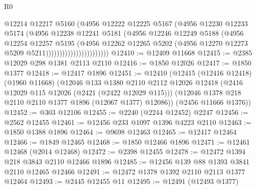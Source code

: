 \begin{lexlean}{R0}
\begin{coremodule}
                                    @12214
                                    @12217
                                    @5160
                                    (@4956
                                      @12222
                                      @12225
                                      @5167
                                      (@4956
                                        @12230
                                        @12233
                                        @5174
                                        (@4956
                                          @12238
                                          @12241
                                          @5181
                                          (@4956
                                            @12246
                                            @12249
                                            @5188
                                            (@4956
                                              @12254
                                              @12257
                                              @5195
                                              (@4956
                                                @12262
                                                @12265
                                                @5202
                                                (@4956
                                                  @12270
                                                  @12273
                                                  @5209
                                                  @5211)))))))))))))))))))))))
@12410 := @12409 @11668
@12415 := @2385 @12029 @298 @1381 @2113 @2110
@12416 := @1850 @12026
@12417 := @1850 @1377
@12418 := @12417 @1896
@12451 := @12410
    (@12415
      (@12416 @12418)
      (@1960 @11668)
      (@12046
        @133
        @1380
        @2110
        @2112
        @12026
        @12418
        (@2416 @12029 @115 @12026 (@2421 (@2422 @12029 @115)))
        (@12046 @1378 @218 @2110 @2110 @1377 @1896 (@12067 @1377) @12086))
      (@2456 @11666 @1376))
@12452 := @303 @12106
@12455 := @2240 (@2244 @12452) @2247
@12456 := @2562 @12455
@12461 := @12456 @233 @1097 @1396 @4223 @2110
@12463 := @1850 @1388 @1896
@12464 := @9698 @12463
@12465 := @12417 @12464
@12466 := @1849 @12465
@12468 := @1850 @12466 @1896
@12471 := @12461 @12468 (@2014 @12468)
@12472 := @2398 @12455
@12478 := @12472 @1394 @218 @3843 @2110 @12466 @1896
@12485 := @12456 @139 @88 @1393 @3841 @2110 @12465 @12466
@12491 := @12472 @1378 @1392 @2110 @2113 @1377 @12464
@12493 := @2445 @12455 @11
@12495 := @12491 (@12493 @1377)

\end{coremodule}
\end{lexlean}
